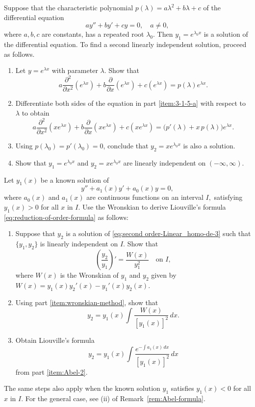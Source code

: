 \begin{Exercise}
 	\Question\label{3-2-6} Suppose that  the characteristic polynomial \(p(\lambda) = a\lambda^2 + b\lambda + c\) of
 the differential equation
 	\[
 	ay'' + by' + cy = 0, \quad a \ne 0,
 	\]
 	where $a, b, c$ are constants,
 	  has a repeated root \(\lambda_0.\) Then \(y_1 = e^{\lambda_0 x}\) is a solution of the differential equation. To find a second linearly independent solution, proceed as follows.
 	
 	\begin{enumerate}[label=(\alph*), noitemsep]
 		\item\label{item:3-1-5-a} Let \(y = e^{\lambda x}\) with parameter \(\lambda\). Show that
 		\[
 		a\frac{\partial^2}{\partial x^2} (e^{\lambda x}) + b\frac{\partial}{\partial x} (e^{\lambda x}) + c (e^{\lambda x}) = p(\lambda) e^{\lambda x}.
 		\]
 		
 		\item Differentiate both sides of the equation in part \ref{item:3-1-5-a} with respect to \(\lambda\) to obtain
 		\[
 		a\frac{\partial^2}{\partial x^2} (x e^{\lambda x}) + b\frac{\partial}{\partial x} (x e^{\lambda x}) + c (x e^{\lambda x}) = \big(p'(\lambda) + x\, p(\lambda)\big) e^{\lambda x}.
 		\]
 		
 		\item Using \(p(\lambda_0) = p'(\lambda_0) = 0\), conclude that \(y_2 = x e^{\lambda_0 x}\) is also a solution.
 		
 		\item Show that \(y_1 =e^{\lambda_0 x}\) and \(y_2=x e^{\lambda_0 x}\) are linearly independent on \((-\infty, \infty)\).
 	\end{enumerate}
 	
 \Question\label{3-2-7} Let $y_1(x)$ be a known  solution of 	
 \begin{equation}\label{eq:second order-Linear_homo-de-3}
 	y'' + a_1(x)y' + a_0(x)y = 0,
 \end{equation}
 where \( a_0(x) \) and \( a_1(x) \) are continuous functions on an interval $I,$  satisfying $y_1(x)>0$ for all $x$ in $I$. Use the Wronskian to derive Liouville’s formula \eqref{eq:reduction-of-order-formula} as follows:
 \begin{enumerate}[label=(\alph*), noitemsep]
 	\item\label{item:wronskian-method} Suppose that $y_2$ is  a solution of \eqref{eq:second order-Linear_homo-de-3} such that $\{y_1, y_2\}$ is linearly independent on $I.$ Show that 
 	\[\left(\frac{y_2}{y_1}\right)' = \frac{W(x)}{y_1^2} \quad \mbox{on } I,\]  where $W(x)$ is the Wronskian of $y_1$ and $y_2$ given by $W(x) =y_1(x)y_2'(x) - y_1'(x)y_2(x).$
 	\item\label{item:Abel-2} Using part \ref{item:wronskian-method}, show  that 
 	\[y_2 = y_1(x) \int\frac{W(x)}{[y_1(x)]^2}\, dx.\]
 	\item Obtain   Liouville's formula \[y_2 = y_1(x) \int\frac{e^{-\int a_1(x)\,dx}}{[y_1(x)]^2}\, dx\] from part \ref{item:Abel-2}.
 \end{enumerate}
 The  same steps  also apply when the  known solution $y_1$ satisfies $y_1(x) <0$ for all $x$ in $I$. For the general case, see (ii) of Remark~\ref{rem:Abel-formula}.
 \end{Exercise}
 
